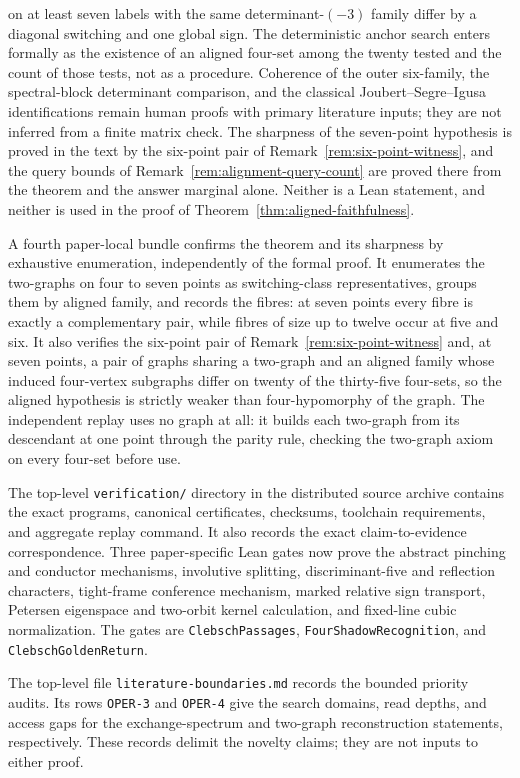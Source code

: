 on at least seven labels with the same determinant-\((-3)\) family differ by a
diagonal switching and one global sign.  The deterministic anchor search enters
formally as the existence of an aligned four-set among the twenty tested and the
count of those tests, not as a procedure.
Coherence of the outer six-family, the spectral-block determinant comparison,
and the classical
Joubert--Segre--Igusa identifications remain human proofs with primary
literature inputs; they are not inferred from a finite matrix check.
The sharpness of the seven-point hypothesis is proved in the text by the
six-point pair of Remark~\ref{rem:six-point-witness}, and the query bounds of
Remark~\ref{rem:alignment-query-count} are proved there from the theorem and
the answer marginal alone.  Neither is a Lean statement, and neither is used in
the proof of Theorem~\ref{thm:aligned-faithfulness}.

A fourth paper-local bundle confirms the theorem and its sharpness by
exhaustive enumeration, independently of the formal proof.  It enumerates the
two-graphs on four to seven points as switching-class representatives, groups
them by aligned family, and records the fibres: at seven points every fibre is
exactly a complementary pair, while fibres of size up to twelve occur at five
and six.  It also verifies the six-point pair of
Remark~\ref{rem:six-point-witness} and, at seven points, a pair of graphs
sharing a two-graph and an aligned family whose induced four-vertex subgraphs
differ on twenty of the thirty-five four-sets, so the aligned hypothesis is
strictly weaker than four-hypomorphy of the graph.  The independent replay uses
no graph at all: it builds each two-graph from its descendant at one point
through the parity rule, checking the two-graph axiom on every four-set before
use.

The top-level \texttt{verification/} directory in the distributed source
archive contains
the exact programs, canonical certificates, checksums, toolchain
requirements, and aggregate replay command.  It also records the exact
claim-to-evidence correspondence.  Three paper-specific Lean gates now prove the
abstract pinching and conductor mechanisms, involutive splitting,
discriminant-five and reflection characters, tight-frame conference mechanism,
marked relative sign transport, Petersen eigenspace and two-orbit kernel
calculation, and fixed-line cubic normalization.  The gates are
\texttt{ClebschPassages}, \texttt{FourShadowRecognition}, and
\texttt{ClebschGoldenReturn}.

The top-level file \texttt{literature-boundaries.md} records the bounded
priority audits.  Its rows \texttt{OPER-3} and \texttt{OPER-4} give the
search domains, read depths, and access gaps for the exchange-spectrum and
two-graph reconstruction statements, respectively.  These records delimit
the novelty claims; they are not inputs to either proof.

